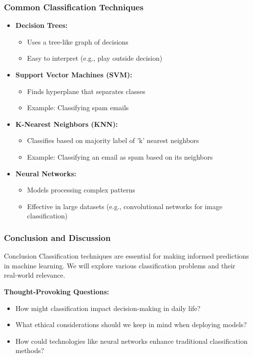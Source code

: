 \documentclass[aspectratio=169]{beamer}
\begin{document}
\begin{frame}[fragile]
    \frametitle{Common Classification Techniques}
    \begin{itemize}
        \item \textbf{Decision Trees:} 
            \begin{itemize}
                \item Uses a tree-like graph of decisions
                \item Easy to interpret (e.g., play outside decision)
            \end{itemize}

        \item \textbf{Support Vector Machines (SVM):} 
            \begin{itemize}
                \item Finds hyperplane that separates classes
                \item Example: Classifying spam emails
            \end{itemize}

        \item \textbf{K-Nearest Neighbors (KNN):} 
            \begin{itemize}
                \item Classifies based on majority label of 'k' nearest neighbors
                \item Example: Classifying an email as spam based on its neighbors
            \end{itemize}

        \item \textbf{Neural Networks:} 
            \begin{itemize}
                \item Models processing complex patterns
                \item Effective in large datasets (e.g., convolutional networks for image classification)
            \end{itemize}
    \end{itemize}
\end{frame}

\begin{frame}[fragile]
    \frametitle{Conclusion and Discussion}
    \begin{block}{Conclusion}
        Classification techniques are essential for making informed predictions in machine learning. 
        We will explore various classification problems and their real-world relevance.
    \end{block}
    \textbf{Thought-Provoking Questions:}
    \begin{itemize}
        \item How might classification impact decision-making in daily life?
        \item What ethical considerations should we keep in mind when deploying models?
        \item How could technologies like neural networks enhance traditional classification methods?
    \end{itemize}
\end{frame}
\end{document}
